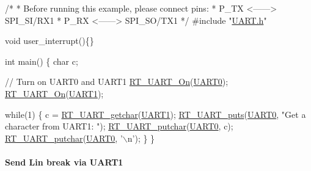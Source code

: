 \begin{DoxyCode}
\textcolor{comment}{/*}
\textcolor{comment}{ * Before running this example, please connect pins:}
\textcolor{comment}{ *      P\_TX <------> SPI\_SI/RX1}
\textcolor{comment}{ *      P\_RX <------> SPI\_SO/TX1  }
\textcolor{comment}{ */}
\textcolor{preprocessor}{#include "\mbox{\hyperlink{a00173}{UART.h}}"}

\textcolor{keywordtype}{void} user\_interrupt()\{\}

\textcolor{keywordtype}{int} main() \{
    \textcolor{keywordtype}{char} c;

    \textcolor{comment}{// Turn on UART0 and UART1}
    \mbox{\hyperlink{a00173_a7c1428a7b16eec7fe710679dd70b4069}{RT\_UART\_On}}(\mbox{\hyperlink{a00173_a0508661f121639ffdee7de2353a0def2}{UART0}});
    \mbox{\hyperlink{a00173_a7c1428a7b16eec7fe710679dd70b4069}{RT\_UART\_On}}(\mbox{\hyperlink{a00173_a8d69bf04d07af4fbbab5a8bd291f65ff}{UART1}});

    \textcolor{keywordflow}{while}(1) \{
        c = \mbox{\hyperlink{a00170_abc136df9d66fe27bf8ffcc319246591e}{RT\_UART\_getchar}}(\mbox{\hyperlink{a00173_a8d69bf04d07af4fbbab5a8bd291f65ff}{UART1}});
        \mbox{\hyperlink{a00170_ad61c03a00ccd43875563c16f97d61af7}{RT\_UART\_puts}}(\mbox{\hyperlink{a00173_a0508661f121639ffdee7de2353a0def2}{UART0}}, \textcolor{stringliteral}{"Get a character from UART1: "});
        \mbox{\hyperlink{a00170_ab03e9e1a8d4d9b97583db27174086108}{RT\_UART\_putchar}}(\mbox{\hyperlink{a00173_a0508661f121639ffdee7de2353a0def2}{UART0}}, c);
        \mbox{\hyperlink{a00170_ab03e9e1a8d4d9b97583db27174086108}{RT\_UART\_putchar}}(\mbox{\hyperlink{a00173_a0508661f121639ffdee7de2353a0def2}{UART0}}, \textcolor{charliteral}{'\(\backslash\)n'});
    \}
\}
\end{DoxyCode}


\paragraph*{Send Lin break via U\+A\+R\+T1}


